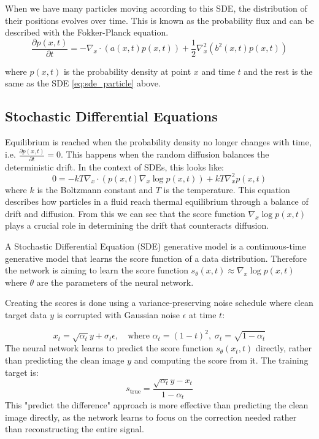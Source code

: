 \documentclass[conference,a4paper]{IEEEtran}
\begin{document}
When we have many particles moving according to this SDE, the distribution of their positions evolves over time. This is known as the probability flux and can be described with the Fokker-Planck equation.
\begin{equation}
    \label{eq:fokker-planck}
    \frac{\partial p(x, t)}{\partial t} = -\nabla_x \cdot (a(x, t)p(x, t)) + \frac{1}{2}\nabla^2_x(b^2(x, t)p(x, t))
\end{equation}

where $p(x, t)$ is the probability density at point $x$ and time $t$ and the rest is the same as the SDE \ref{eq:sde_particle} above.

\subsection{Stochastic Differential Equations}

Equilibrium is reached when the probability density no longer changes with time, i.e. $\frac{\partial p(x, t)}{\partial t} = 0$. This happens when the random diffusion balances the deterministic drift. In the context of SDEs, this looks like:
\begin{equation}
    \label{eq:equilibrium}
    0 = -kT \nabla_x \cdot (p(x, t) \nabla_x \log p(x,t)) + kT \nabla_x^2 p(x, t)
\end{equation}
where $k$ is the Boltzmann constant and $T$ is the temperature. This equation describes how particles in a fluid reach thermal equilibrium through a balance of drift and diffusion. From this we can see that the score function $\nabla_x \log p(x,t)$ plays a crucial role in determining the drift that counteracts diffusion.

A Stochastic Differential Equation (SDE) generative model \cite{songScoreBasedGenerativeModeling2021} is a continuous-time generative model that learns the score function of a data distribution. Therefore the network is aiming to learn the score function $s_\theta(x, t) \approx \nabla_x \log p(x,t)$ where $\theta$ are the parameters of the neural network.

Creating the scores is done using a variance-preserving noise schedule where clean target data $y$ is corrupted with Gaussian noise $\epsilon$ at time $t$:

\begin{equation}
    x_t = \sqrt{\alpha_t}y + \sigma_t\epsilon, \quad \text{where } \alpha_t = (1-t)^2, \; \sigma_t = \sqrt{1 - \alpha_t}
\end{equation}
The neural network learns to predict the score function $s_\theta(x_t, t)$ directly, rather than predicting the clean image $y$ and computing the score from it. The training target is:
\begin{equation}
    s_{\text{true}} = \frac{\sqrt{\alpha_t}y - x_t}{1 - \alpha_t}
\end{equation}
This "predict the difference" approach is more effective than predicting the clean image directly, as the network learns to focus on the correction needed rather than reconstructing the entire signal.
\end{document}
